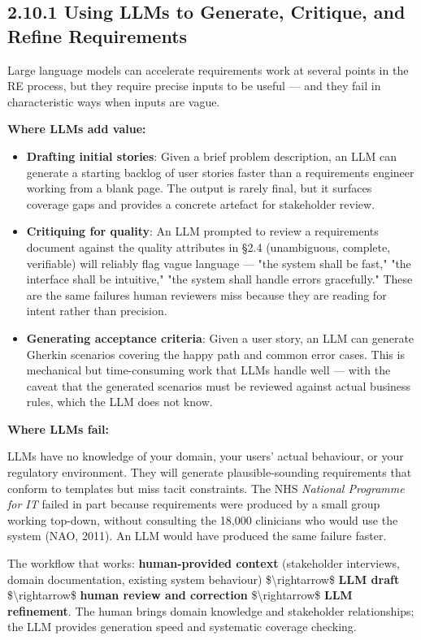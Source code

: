\documentclass[11pt,a4paper]{book}
\begin{document}
\subsection{2.10.1 Using LLMs to Generate, Critique, and Refine Requirements}

Large language models can accelerate requirements work at several points in the RE process, but they require precise inputs to be useful --- and they fail in characteristic ways when inputs are vague.

\textbf{Where LLMs add value:}

\begin{itemize}
  \item \textbf{Drafting initial stories}: Given a brief problem description, an LLM can generate a starting backlog of user stories faster than a requirements engineer working from a blank page. The output is rarely final, but it surfaces coverage gaps and provides a concrete artefact for stakeholder review.
  \item \textbf{Critiquing for quality}: An LLM prompted to review a requirements document against the quality attributes in §2.4 (unambiguous, complete, verifiable) will reliably flag vague language --- "the system shall be fast," "the interface shall be intuitive," "the system shall handle errors gracefully." These are the same failures human reviewers miss because they are reading for intent rather than precision.
  \item \textbf{Generating acceptance criteria}: Given a user story, an LLM can generate Gherkin scenarios covering the happy path and common error cases. This is mechanical but time-consuming work that LLMs handle well --- with the caveat that the generated scenarios must be reviewed against actual business rules, which the LLM does not know.
\end{itemize}

\textbf{Where LLMs fail:}

LLMs have no knowledge of your domain, your users' actual behaviour, or your regulatory environment. They will generate plausible-sounding requirements that conform to templates but miss tacit constraints. The NHS \textit{National Programme for IT} failed in part because requirements were produced by a small group working top-down, without consulting the 18,000 clinicians who would use the system (NAO, 2011). An LLM would have produced the same failure faster.

The workflow that works: \textbf{human-provided context} (stakeholder interviews, domain documentation, existing system behaviour) \$\textbackslash{}rightarrow\$ \textbf{LLM draft} \$\textbackslash{}rightarrow\$ \textbf{human review and correction} \$\textbackslash{}rightarrow\$ \textbf{LLM refinement}. The human brings domain knowledge and stakeholder relationships; the LLM provides generation speed and systematic coverage checking.
\end{document}
